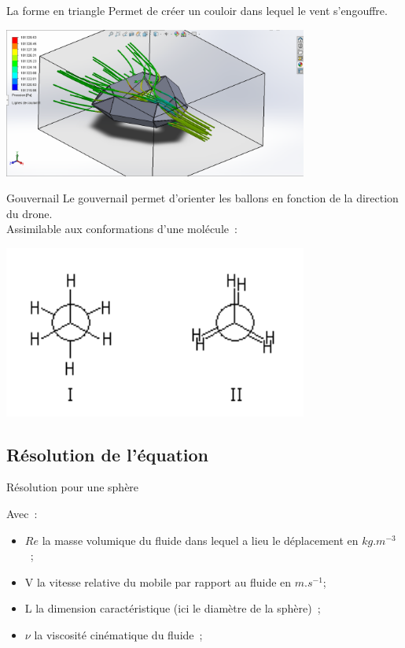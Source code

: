 \begin{frame}{La forme en triangle}
	Permet de créer un couloir dans lequel le vent s'engouffre.
  \begin{center}
		\includegraphics[width=10cm]{../Images/Capture.PNG}
	\end{center}
\end{frame}

\begin{frame}{Gouvernail}
	Le gouvernail permet d'orienter les ballons en fonction de la direction du drone.\\
  Assimilable aux conformations d'une molécule~:
  \begin{center}
		\includegraphics[width=10cm]{../Images/conformations.png}
	\end{center}
\end{frame}

\subsection{Résolution de l'équation}
\begin{frame}{Résolution pour une sphère}
\begin{center}
\end{center}
Avec~:
\begin{itemize}
 \item $Re$ la masse volumique du fluide dans lequel a lieu le déplacement en $kg.m^{-3}$~;
 \item V la vitesse relative du mobile par rapport au fluide en $m.s^{-1}$;
 \item L la dimension caractéristique (ici le diamètre de la sphère)~;
 \item $\nu$ la viscosité cinématique du fluide~;
\end{itemize}
\end{frame}


